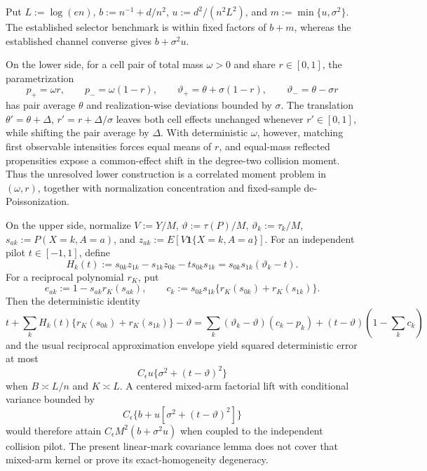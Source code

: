 Put \(L:=\log(en)\), \(b:=n^{-1}+d/n^2\), \(u:=d^2/(n^2L^2)\), and \(m:=\min\{u,\sigma^2\}\).  The established selector benchmark is within fixed factors of \(b+m\), whereas the established channel converse gives \(b+\sigma^2u\).

On the lower side, for a cell pair of total mass \(\omega>0\) and share \(r\in[0,1]\), the parametrization
\[
p_+=\omega r,\qquad p_-=\omega(1-r),\qquad
\vartheta_+=\theta+\sigma(1-r),\qquad
\vartheta_-=\theta-\sigma r
\]
has pair average \(\theta\) and realization-wise deviations bounded by \(\sigma\).  The translation \(\theta'=\theta+\Delta\), \(r'=r+\Delta/\sigma\) leaves both cell effects unchanged whenever \(r'\in[0,1]\), while shifting the pair average by \(\Delta\).  With deterministic \(\omega\), however, matching first observable intensities forces equal means of \(r\), and equal-mass reflected propensities expose a common-effect shift in the degree-two collision moment.  Thus the unresolved lower construction is a correlated moment problem in \((\omega,r)\), together with normalization concentration and fixed-sample de-Poissonization.

On the upper side, normalize \(V:=Y/M\), \(\vartheta:=\tau(P)/M\), \(\vartheta_k:=\tau_k/M\), \(s_{ak}:=P(X=k,A=a)\), and \(z_{ak}:=E[V\mathbf1\{X=k,A=a\}]\).  For an independent pilot \(t\in[-1,1]\), define
\[
H_k(t):=s_{0k}z_{1k}-s_{1k}z_{0k}-ts_{0k}s_{1k}
=s_{0k}s_{1k}(\vartheta_k-t).
\]
For a reciprocal polynomial \(r_K\), put
\[
e_{ak}:=1-s_{ak}r_K(s_{ak}),\qquad
c_k:=s_{0k}s_{1k}\{r_K(s_{0k})+r_K(s_{1k})\}.
\]
Then the deterministic identity
\[
t+\sum_kH_k(t)\{r_K(s_{0k})+r_K(s_{1k})\}-\vartheta
=\sum_k(\vartheta_k-\vartheta)(c_k-p_k)
+(t-\vartheta)\left(1-\sum_kc_k\right)
\]
and the usual reciprocal approximation envelope yield squared deterministic error at most
\[
C_\epsilon u\{\sigma^2+(t-\vartheta)^2\}
\]
when \(B\asymp L/n\) and \(K\asymp L\).  A centered mixed-arm factorial lift with conditional variance bounded by
\[
C_\epsilon\{b+u[\sigma^2+(t-\vartheta)^2]\}
\]
would therefore attain \(C_\epsilon M^2(b+\sigma^2u)\) when coupled to the independent collision pilot.  The present linear-mark covariance lemma does not cover that mixed-arm kernel or prove its exact-homogeneity degeneracy.